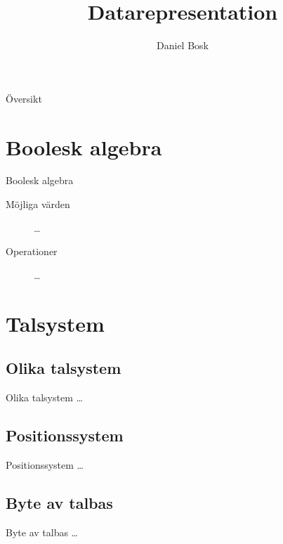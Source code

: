 \documentclass{beamer}
\title[Introduktion]{%
	Datarepresentation
}
\author{Daniel Bosk}
\institute[MIUN ITM]{%
	Institutionen för informationsteknologi och medier (ITM),\\
	Mittuniversitetet, Sundsvall.
}
\date{\svnId}
\begin{document}
\begin{frame}
  \titlepage
\end{frame}

\begin{frame}{Översikt}
	\tableofcontents
\end{frame}





\section{Boolesk algebra}

\begin{frame}{Boolesk algebra}
	\begin{description}
		\item[Möjliga värden] \dots
		\item[Operationer] \dots
	\end{description}
\end{frame}


\section{Talsystem}

\subsection{Olika talsystem}
\begin{frame}{Olika talsystem}
	\dots
\end{frame}

\subsection{Positionssystem}
\begin{frame}{Positionssystem}
	\dots
\end{frame}

\subsection{Byte av talbas}
\begin{frame}{Byte av talbas}
	\dots
\end{frame}
\end{document}
